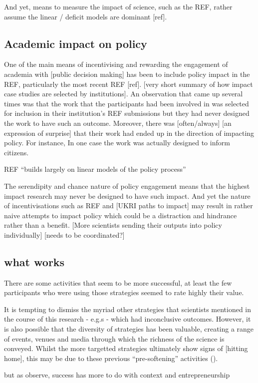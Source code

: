
And yet, means to measure the impact of science, such as the REF, rather assume the linear / deficit models are dominant [ref]. 



\subsection{Academic impact on policy}
One of the main means of incentivising and rewarding the engagement of academia with [public decision making] has been to include policy impact in the REF, particularly the most recent REF [ref]. [very short summary of how impact case studies are selected by institutions]. An observation that came up several times was that the work that the participants had been involved in was selected for inclusion in their institution's REF submissions but they had never designed the work to have such an outcome. Moreover, there was [often/always] [an expression of surprise] that their work had ended up in the direction of impacting policy. For instance, In one case the work was actually designed to inform citizens. 

REF ``builds largely on linear models of the policy process'' \cite{CairneyO2020}

The serendipity and chance nature of policy engagement means that the highest impact research may never be designed to have such impact. And yet the nature of incentivisations such as REF and [UKRI paths to impact] may result in rather naive attempts to impact policy which could be a distraction and hindrance rather than a benefit. [More scientists sending their outputs into policy individually] [needs to be coordinated?]

\subsection{what works}
There are some activities that seem to be more successful, at least the few participants who were using those strategies seemed to rate highly their value. 

It is tempting to dismiss the myriad other strategies that scientists mentioned in the course of this research - e.g.s - which had inconclusive outcomes. However, it is also possible that the diversity of strategies has been valuable, creating a range of events, venues and media through which the richness of the science is conveyed. Whilst the more targetted strategies ultimately show signs of [hitting home], this may be due to these previous ``pre-softening'' activities (\cite{Cairney2018}).

but as \textcite{CairneyO2020} observe, success has more to do with context and entrepreneurship
